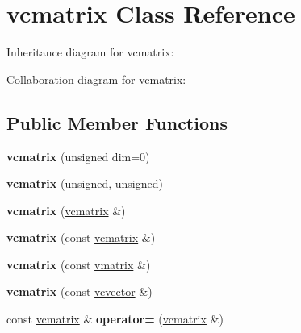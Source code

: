\hypertarget{classvcmatrix}{}\section{vcmatrix Class Reference}
\label{classvcmatrix}


Inheritance diagram for vcmatrix\+:


Collaboration diagram for vcmatrix\+:
\subsection*{Public Member Functions}
\begin{DoxyCompactItemize}
\item 
{\bfseries vcmatrix} (unsigned dim=0)\hypertarget{classvcmatrix_a350f376d7eabb68249cfb176fcc6cc3e}{}\label{classvcmatrix_a350f376d7eabb68249cfb176fcc6cc3e}

\item 
{\bfseries vcmatrix} (unsigned, unsigned)\hypertarget{classvcmatrix_aa79433d7a4e2e69ae165ba6f4cd32b32}{}\label{classvcmatrix_aa79433d7a4e2e69ae165ba6f4cd32b32}

\item 
{\bfseries vcmatrix} (\hyperlink{classvcmatrix}{vcmatrix} \&)\hypertarget{classvcmatrix_afecd145a1ace72d0b002c71cb73f9125}{}\label{classvcmatrix_afecd145a1ace72d0b002c71cb73f9125}

\item 
{\bfseries vcmatrix} (const \hyperlink{classvcmatrix}{vcmatrix} \&)\hypertarget{classvcmatrix_a9bdda0aae2fc43b1fb24bb079ed63ee4}{}\label{classvcmatrix_a9bdda0aae2fc43b1fb24bb079ed63ee4}

\item 
{\bfseries vcmatrix} (const \hyperlink{classvmatrix}{vmatrix} \&)\hypertarget{classvcmatrix_a18d28c980c019ade498ad30385ecde84}{}\label{classvcmatrix_a18d28c980c019ade498ad30385ecde84}

\item 
{\bfseries vcmatrix} (const \hyperlink{classvcvector}{vcvector} \&)\hypertarget{classvcmatrix_a86d0ce31066e44c467c3c08fc9f1b158}{}\label{classvcmatrix_a86d0ce31066e44c467c3c08fc9f1b158}

\item 
const \hyperlink{classvcmatrix}{vcmatrix} \& {\bfseries operator=} (\hyperlink{classvcmatrix}{vcmatrix} \&)\hypertarget{classvcmatrix_a1d7568c7fe8e3420ef9d5374b88a397b}{}\label{classvcmatrix_a1d7568c7fe8e3420ef9d5374b88a397b}


\end{DoxyCompactItemize}
